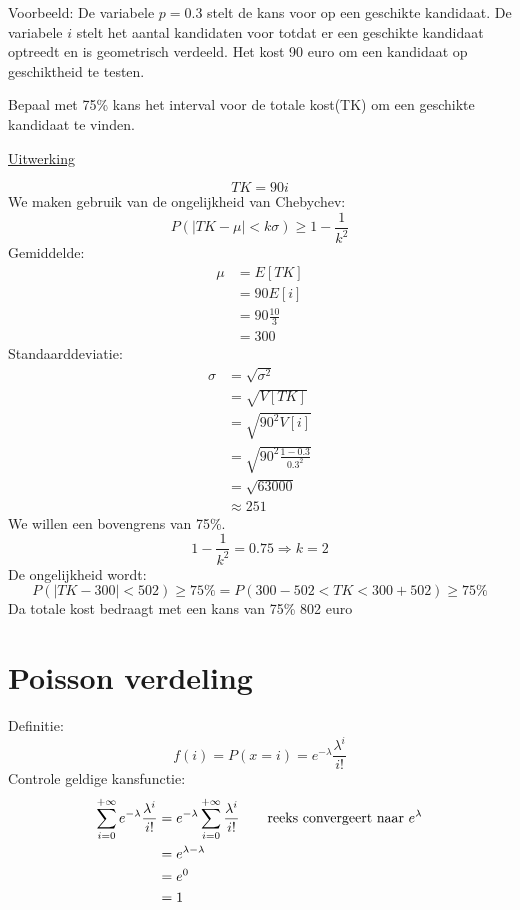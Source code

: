 \documentclass[12pt]{report}
\newcommand{\example}[2]{
      \hrulefill
      
      Voorbeeld: #1
      
      \underline{Uitwerking}
      
      #2
      
      \hrulefill
  }
\begin{document}
\example{ 
    De variabele $p = 0.3$ stelt de kans voor op een geschikte kandidaat. De variabele $i$ stelt het aantal kandidaten voor totdat er een geschikte kandidaat optreedt en is geometrisch verdeeld. Het kost 90 euro om een kandidaat op geschiktheid te testen. 
    
    Bepaal met 75\% kans het interval voor de totale kost(TK) om een geschikte kandidaat te vinden.
}{
    $$TK = 90i$$
    We maken gebruik van de ongelijkheid van Chebychev:
    $$P(|TK - \mu| < k\sigma) \geq 1 - \frac{1}{k^2}$$
    Gemiddelde:
    \begin{equation*}
     \begin{split}
      \mu & = E[TK] \\
          & = 90E[i] \\
          & = 90\frac{10}{3} \\
          & = 300
     \end{split}
    \end{equation*}
    Standaarddeviatie:
    \begin{equation*}
     \begin{split}
      \sigma & = \sqrt{\sigma^2} \\
             & = \sqrt{V[TK]} \\
             & = \sqrt{90^2V[i]} \\
             & = \sqrt{90^2\frac{1 - 0.3}{0.3^2}} \\
             & = \sqrt{63000} \\
             & \approx 251
     \end{split}
    \end{equation*}
    We willen een bovengrens van 75\%.
    $$1 - \frac{1}{k^2} = 0.75 \Rightarrow k = 2$$
    De ongelijkheid wordt:
    $$P(|TK - 300| < 502) \geq 75\% = P(300 - 502 < TK < 300 + 502) \geq 75\%$$
    Da totale kost bedraagt met een kans van 75\% 802 euro

}

\section{Poisson verdeling}
Definitie:
$$f(i) = P(x = i) = e^{-\lambda}\frac{\lambda^i}{i!}$$
Controle geldige kansfunctie:
\begin{equation*}
 \begin{split}
  \sum_{i=0}^{+\infty}e^{-\lambda}\frac{\lambda^i}{i!} & = e^{-\lambda}\sum_{i=0}^{+\infty}\frac{\lambda^i}{i!} \qquad \hbox{reeks convergeert naar } e^{\lambda}\\
  & = e^{\lambda - \lambda} \\
  & = e^{0} \\
  & = 1
 \end{split}
\end{equation*}
\end{document}
